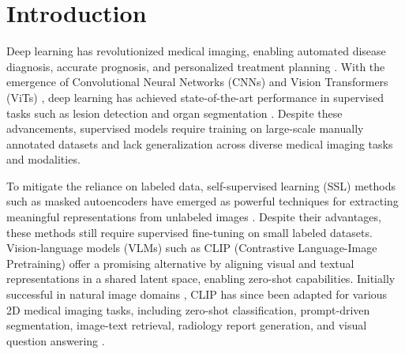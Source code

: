 \section*{Introduction}
Deep learning has revolutionized medical imaging, enabling automated disease diagnosis, accurate prognosis, and personalized treatment planning \cite{litjens2017survey, esteva2021deep, shen2017deep, fink2020potential}. With the emergence of Convolutional Neural Networks (CNNs) \cite{fukushima1980neocognitron, lecun1989handwritten} and Vision Transformers (ViTs) \cite{dosovitskiy2020image}, deep learning has achieved state-of-the-art performance in supervised tasks such as lesion detection and organ segmentation \cite{ronneberger2015u, chen2021transunet, cao2022swin, wang2022uctransnet, ates2023dual}. Despite these advancements, supervised models require training on large-scale manually annotated datasets and lack generalization across diverse medical imaging tasks and modalities.

To mitigate the reliance on labeled data, self-supervised learning (SSL) methods such as masked autoencoders \cite{he2022masked} have emerged as powerful techniques for extracting meaningful representations from unlabeled images \cite{tang2022self, chen2022scaling}. Despite their advantages, these methods still require supervised fine-tuning on small labeled datasets. Vision-language models (VLMs) such as CLIP (Contrastive Language-Image Pretraining) \cite{radford2021learning} offer a promising alternative by aligning visual and textual representations in a shared latent space, enabling zero-shot capabilities. Initially successful in natural image domains \cite{lin2022frozen, thengane2022clip}, CLIP has since been adapted for various 2D medical imaging tasks, including zero-shot classification, prompt-driven segmentation, image-text retrieval, radiology report generation, and visual question answering \cite{koleilat2024medclip, lu2024multimodal, tiu2022expert, endo2021retrieval, hu2022x, eslami2023pubmedclip, huang2023visual}.

